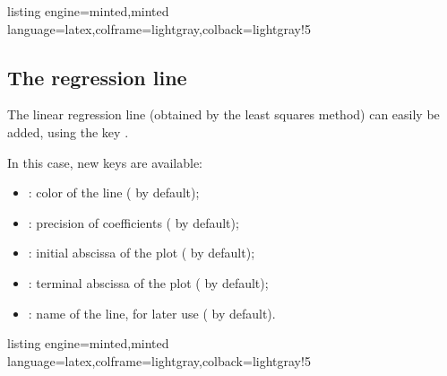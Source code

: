 \documentclass[11pt,a4paper]{ltxdoc}
\begin{document}
\begin{tcblisting}{listing engine=minted,minted language=latex,colframe=lightgray,colback=lightgray!5}
\begin{GraphTikz}%
	[x=0.075cm,y=0.03cm,Xmin=0,Xmax=160,Xgrid=20,Xgrids=10,
	Origy=250,Ymin=250,Ymax=400,Ygrid=25,Ygrids=5]
\end{GraphTikz}
\end{tcblisting}

\subsection{The regression line}\label{reglin}

The linear regression line (obtained by the least squares method) can easily be added, using the key .

\smallskip

In this case, new keys are available:

\smallskip

\begin{itemize}
	\item {}: color of the line ( by default);
	\item {}: precision of coefficients ( by default);
	\item {}: initial abscissa of the plot ( by default);
	\item {}: terminal abscissa of the plot ( by default);
	\item {}: name of the line, for later use ( by default).
\end{itemize}

\begin{tcblisting}{listing engine=minted,minted language=latex,colframe=lightgray,colback=lightgray!5}
\begin{GraphTikz}%
	[x=0.075cm,y=0.03cm,Xmin=0,Xmax=160,Xgrid=20,Xgrids=10,
	Origy=250,Ymin=250,Ymax=400,Ygrid=25,Ygrids=5]
\end{GraphTikz}
\end{tcblisting}
\end{document}
